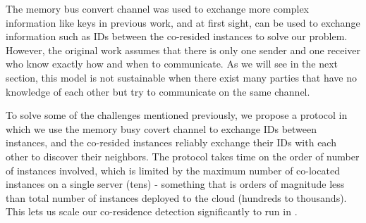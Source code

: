 The memory bus convert channel was used to exchange more complex
information like keys in previous work\cite{wuusenix2012}, and at first sight,
can be used to exchange information such as IDs between the co-resided instances
to solve our problem.  However, the original work assumes that there is only one
sender and one receiver who know exactly how and when to communicate. As we will
see in the next section, this model is not sustainable when there exist many
parties that have no knowledge of each other but try to communicate on the same
channel.

To solve some of the challenges mentioned previously, we propose a protocol in
which we use the memory busy covert channel to exchange IDs between instances,
and the co-resided instances reliably exchange their IDs with each other to
discover their neighbors. The protocol
takes time on the order of number of instances involved, which is limited by the
maximum number of co-located instances on a single server (tens) - something
that is orders of magnitude less than total number of instances deployed to the
cloud (hundreds to thousands).  This lets us scale our co-residence detection
significantly to run in .

